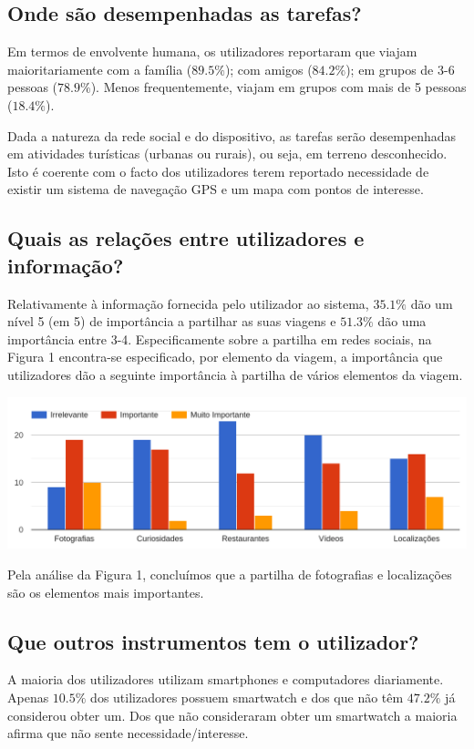 \documentclass[a4paper]{article}
\begin{document}
\begin{multicols}{2}
\subsection{Onde são desempenhadas as tarefas?}
Em termos de envolvente humana, os utilizadores reportaram que viajam maioritariamente com a família ($89.5\%$); com amigos
  ($84.2\%$); em grupos de 3-6 pessoas ($78.9\%$). Menos frequentemente, viajam
  em grupos com mais de 5 pessoas ($18.4\%$).

Dada a natureza da rede social e do dispositivo, as tarefas serão desempenhadas
  em atividades turísticas (urbanas ou rurais), ou seja, em terreno
  desconhecido. Isto é coerente com o facto dos utilizadores terem reportado
  necessidade de existir um sistema de navegação GPS e um mapa com pontos de
  interesse.

\subsection{Quais as relações entre utilizadores e informação?}
Relativamente à informação fornecida pelo utilizador ao sistema, $35.1\%$ dão um
  nível 5 (em 5) de importância a partilhar as suas viagens e $51.3\%$ dão uma
  importância entre 3-4. Especificamente sobre a partilha em redes sociais, na
  Figura 1 encontra-se especificado, por elemento da viagem, a importância que
  utilizadores dão a seguinte importância à partilha de vários elementos da
  viagem.
  \begin{center}
    \includegraphics[width=\linewidth]{importance}
  \end{center}
  Pela análise da Figura 1, concluímos que a partilha de fotografias e
  localizações são os elementos mais importantes.

\subsection{Que outros instrumentos tem o utilizador?}
A maioria dos utilizadores utilizam smartphones e computadores diariamente.
Apenas $10.5\%$ dos utilizadores possuem smartwatch e dos que não têm $47.2\%$
já considerou obter um. Dos que não consideraram obter um smartwatch a maioria
afirma que não sente necessidade/interesse.


\end{multicols}
\end{document}
